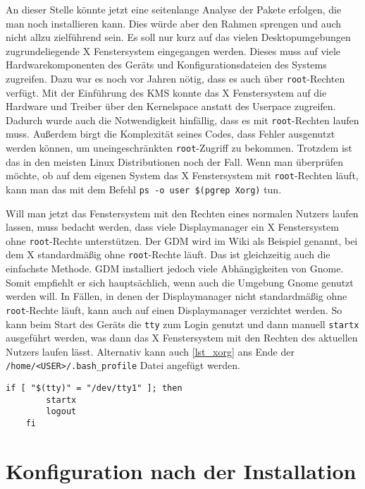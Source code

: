 An dieser Stelle könnte jetzt eine seitenlange Analyse der Pakete erfolgen, die man noch installieren kann. Dies würde aber den Rahmen sprengen und auch nicht allzu zielführend sein. Es soll nur kurz auf das vielen Desktopumgebungen zugrundeliegende X Fenstersystem\cite{OrgWiki} eingegangen werden. Dieses muss auf viele Hardwarekomponenten des Geräts und Konfigurationsdateien des Systems zugreifen. Dazu war es noch vor Jahren nötig, dass es auch über \texttt{root}-Rechten verfügt. Mit der Einführung des \ac{KMS} konnte das X Fenstersystem auf die Hardware und Treiber über den Kernelspace anstatt des Userpace zugreifen.\cite{Rootless2009} Dadurch wurde auch die Notwendigkeit hinfällig, dass es mit \texttt{root}-Rechten laufen muss. Außerdem birgt die Komplexität seines Codes, dass Fehler ausgenutzt werden können, um uneingeschränkten \texttt{root}-Zugriff zu bekommen.\cite{ChangesXorgWithoutRootRightsFedora} Trotzdem ist das in den meisten Linux Distributionen noch der Fall. Wenn man überprüfen möchte, ob auf dem eigenen System das X Fenstersystem mit \texttt{root}-Rechten läuft, kann man das mit dem Befehl \texttt{ps -o user \$(pgrep Xorg)} tun.

Will man jetzt das Fenstersystem mit den Rechten eines normalen Nutzers laufen lassen, muss bedacht werden, dass viele Displaymanager ein X Fenstersystem ohne \texttt{root}-Rechte unterstützen. Der \ac{GDM} wird im Wiki als Beispiel genannt, bei dem X standardmäßig ohne \texttt{root}-Rechte läuft.\cite{XorgArchWiki} Das ist gleichzeitig auch die einfachste Methode. \ac{GDM} installiert jedoch viele Abhängigkeiten von Gnome. Somit empfiehlt er sich hauptsächlich, wenn auch die Umgebung Gnome genutzt werden will. In Fällen, in denen der Displaymanager nicht standardmäßig ohne \texttt{root}-Rechte läuft, kann auch auf einen Displaymanager verzichtet werden. So kann beim Start des Geräts die \texttt{tty} zum Login genutzt und dann manuell \texttt{startx} ausgeführt werden, was dann das X Fenstersystem mit den Rechten des aktuellen Nutzers laufen lässt. Alternativ kann auch \autoref{lst_xorg} ans Ende der \texttt{/home/<USER>/.bash\_profile} Datei angefügt werden.\cite{ArchWiki}

\begin{lstlisting}[caption=X beim Login starten, label=lst_xorg]
	if [ "$(tty)" = "/dev/tty1" ]; then
		startx
		logout
	fi
\end{lstlisting}

\section{Konfiguration nach der Installation}
